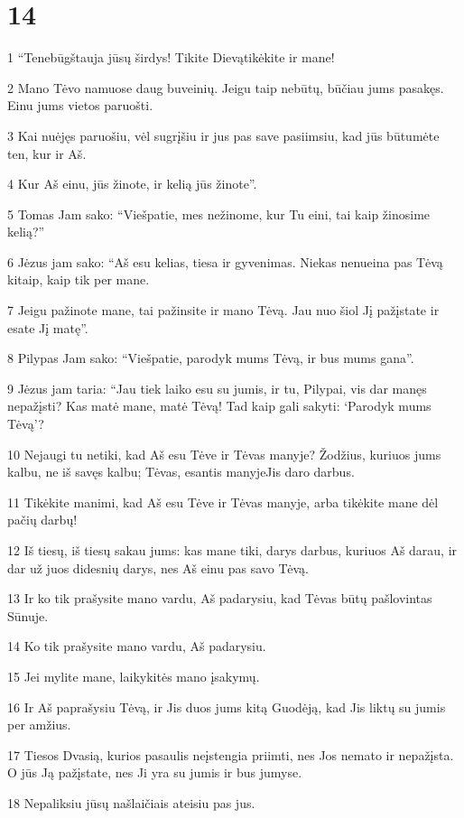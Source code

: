 \chapter{14}


\par 1 “Tenebūgštauja jūsų širdys! Tikite Dievą­tikėkite ir mane! 
\par 2 Mano Tėvo namuose daug buveinių. Jeigu taip nebūtų, būčiau jums pasakęs. Einu jums vietos paruošti. 
\par 3 Kai nuėjęs paruošiu, vėl sugrįšiu ir jus pas save pasiimsiu, kad jūs būtumėte ten, kur ir Aš. 
\par 4 Kur Aš einu, jūs žinote, ir kelią jūs žinote”. 
\par 5 Tomas Jam sako: “Viešpatie, mes nežinome, kur Tu eini, tai kaip žinosime kelią?” 
\par 6 Jėzus jam sako: “Aš esu kelias, tiesa ir gyvenimas. Niekas nenueina pas Tėvą kitaip, kaip tik per mane. 
\par 7 Jeigu pažinote mane, tai pažinsite ir mano Tėvą. Jau nuo šiol Jį pažįstate ir esate Jį matę”. 
\par 8 Pilypas Jam sako: “Viešpatie, parodyk mums Tėvą, ir bus mums gana”. 
\par 9 Jėzus jam taria: “Jau tiek laiko esu su jumis, ir tu, Pilypai, vis dar manęs nepažįsti? Kas matė mane, matė Tėvą! Tad kaip gali sakyti: ‘Parodyk mums Tėvą’? 
\par 10 Nejaugi tu netiki, kad Aš esu Tėve ir Tėvas manyje? Žodžius, kuriuos jums kalbu, ne iš savęs kalbu; Tėvas, esantis manyje­Jis daro darbus. 
\par 11 Tikėkite manimi, kad Aš esu Tėve ir Tėvas manyje, arba tikėkite mane dėl pačių darbų! 
\par 12 Iš tiesų, iš tiesų sakau jums: kas mane tiki, darys darbus, kuriuos Aš darau, ir dar už juos didesnių darys, nes Aš einu pas savo Tėvą. 
\par 13 Ir ko tik prašysite mano vardu, Aš padarysiu, kad Tėvas būtų pašlovintas Sūnuje. 
\par 14 Ko tik prašysite mano vardu, Aš padarysiu. 
\par 15 Jei mylite mane, laikykitės mano įsakymų. 
\par 16 Ir Aš paprašysiu Tėvą, ir Jis duos jums kitą Guodėją, kad Jis liktų su jumis per amžius. 
\par 17 Tiesos Dvasią, kurios pasaulis neįstengia priimti, nes Jos nemato ir nepažįsta. O jūs Ją pažįstate, nes Ji yra su jumis ir bus jumyse. 
\par 18 Nepaliksiu jūsų našlaičiais­ ateisiu pas jus. 
